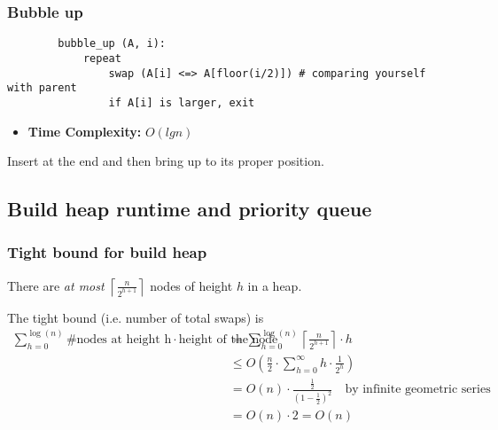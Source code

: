    \subsubsection{Bubble up}
    \begin{definition}
        \begin{lstlisting}
        bubble_up (A, i):
            repeat
                swap (A[i] <=> A[floor(i/2)]) # comparing yourself with parent
                if A[i] is larger, exit
        \end{lstlisting}
        \begin{itemize}
            \item \textbf{Time Complexity:} $O(lg n)$
        \end{itemize}
    \end{definition}
    
    \begin{intuition}
        Insert at the end and then bring up to its proper position.
    \end{intuition}

\subsection{Build heap runtime and priority queue}
    \subsubsection{Tight bound for build heap}
    \begin{definition}
        There are \emph{at most} \( \left\lceil \frac{n}{2^{h+1}} \right\rceil \) nodes of height \( h \) in a heap.
        \vspace{1em}

        The tight bound (i.e. number of total swaps) is
        \begin{align*}
            \sum_{h=0}^{\log(n)} \text{\# nodes at height h} \cdot \text{height of the node} &= \sum_{h=0}^{\log(n)} \left\lceil \frac{n}{2^{h+1}} \right\rceil \cdot h \\
            &\leq O\left(\frac{n}{2} \cdot \sum_{h=0}^{\infty} h \cdot \frac{1}{2^h}\right) \\ 
            &= O(n) \cdot \frac{\frac{1}{2}}{(1 - \frac{1}{2})^2} \quad \text{by infinite geometric series} \\
            &= O(n) \cdot 2 = O(n)
        \end{align*}
    \end{definition}

